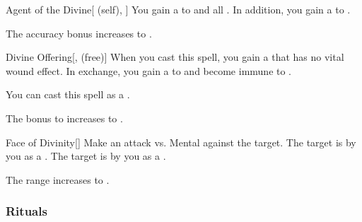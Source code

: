 \lowercase{\hypertarget{spell:Agent of the Divine}{}}\label{spell:Agent of the Divine}
\begin{attuneability}[Rank 5]{\hypertarget{spell:Agent of the Divine}{Agent of the Divine}}[ (self), ]
You gain a   to  and all .
In addition, you gain a   to .

\rankline
{} The accuracy bonus increases to .
\end{attuneability}
\vspace{0.25em}



\lowercase{\hypertarget{spell:Divine Offering}{}}\label{spell:Divine Offering}
\begin{freeability}[Rank 6]{\hypertarget{spell:Divine Offering}{Divine Offering}}[,  (free)]
When you cast this spell, you gain a  that has no vital wound effect.
In exchange, you gain a   to  and become immune to .

You can cast this spell as a .

\rankline
{} The bonus to  increases to .
\end{freeability}
\vspace{0.25em}



\lowercase{\hypertarget{spell:Face of Divinity}{}}\label{spell:Face of Divinity}
\begin{freeability}[Rank 6]{\hypertarget{spell:Face of Divinity}{Face of Divinity}}[]
Make an attack vs. Mental against the target.
\hit The target is \shaken by you as a .
\crit The target is  by you as a .

\rankline
{} The range increases to \rnglong.
\end{freeability}
\vspace{0.25em}



\subsubsection{Rituals}


